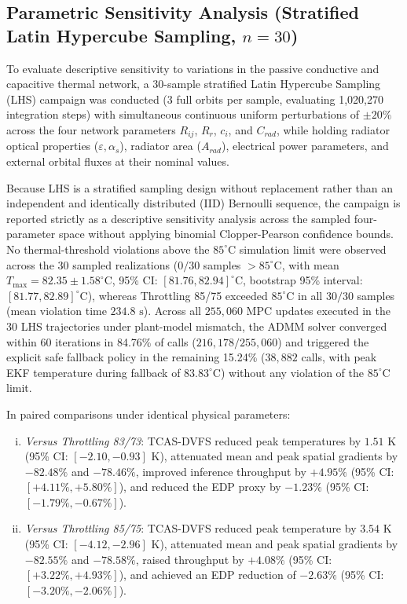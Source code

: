 \documentclass[a4paper,fleqn]{cas-dc}
\begin{document}
\subsection{Parametric Sensitivity Analysis (Stratified Latin Hypercube Sampling, $n=30$)}
\label{sec:incerteza}
To evaluate descriptive sensitivity to variations in the passive conductive and capacitive thermal network, a 30-sample stratified Latin Hypercube Sampling (LHS) campaign was conducted (3 full orbits per sample, evaluating 1,020,270 integration steps) with simultaneous continuous uniform perturbations of $\pm20\%$ across the four network parameters $R_{ij}$, $R_r$, $c_i$, and $C_{rad}$, while holding radiator optical properties ($\varepsilon, \alpha_s$), radiator area ($A_{rad}$), electrical power parameters, and external orbital fluxes at their nominal values.

Because LHS is a stratified sampling design without replacement rather than an independent and identically distributed (IID) Bernoulli sequence, the campaign is reported strictly as a descriptive sensitivity analysis across the sampled four-parameter space without applying binomial Clopper-Pearson confidence bounds. No thermal-threshold violations above the $85^\circ\text{C}$ simulation limit were observed across the 30 sampled realizations ($0/30$ samples $> 85^\circ\text{C}$, with mean $T_{\max} = 82.35 \pm 1.58^\circ\text{C}$, 95\% CI: $[81.76, 82.94]^\circ\text{C}$, bootstrap 95\% interval: $[81.77, 82.89]^\circ\text{C}$), whereas Throttling 85/75 exceeded $85^\circ\text{C}$ in all $30/30$ samples (mean violation time $234.8\text{ s}$). Across all $255,060$ MPC updates executed in the 30 LHS trajectories under plant-model mismatch, the ADMM solver converged within 60 iterations in 84.76\% of calls ($216,178/255,060$) and triggered the explicit safe fallback policy in the remaining 15.24\% ($38,882$ calls, with peak EKF temperature during fallback of $83.83^\circ\text{C}$) without any violation of the $85^\circ\text{C}$ limit.

In paired comparisons under identical physical parameters:
\begin{enumerate}[(i)]
\item \textit{Versus Throttling 83/73}: TCAS-DVFS reduced peak temperatures by $1.51\text{ K}$ (95\% CI: $[-2.10, -0.93]\text{ K}$), attenuated mean and peak spatial gradients by $-82.48\%$ and $-78.46\%$, improved inference throughput by $+4.95\%$ (95\% CI: $[+4.11\%, +5.80\%]$), and reduced the EDP proxy by $-1.23\%$ (95\% CI: $[-1.79\%, -0.67\%]$).
\item \textit{Versus Throttling 85/75}: TCAS-DVFS reduced peak temperature by $3.54\text{ K}$ (95\% CI: $[-4.12, -2.96]\text{ K}$), attenuated mean and peak spatial gradients by $-82.55\%$ and $-78.58\%$, raised throughput by $+4.08\%$ (95\% CI: $[+3.22\%, +4.93\%]$), and achieved an EDP reduction of $-2.63\%$ (95\% CI: $[-3.20\%, -2.06\%]$).
\end{enumerate}
\end{document}
